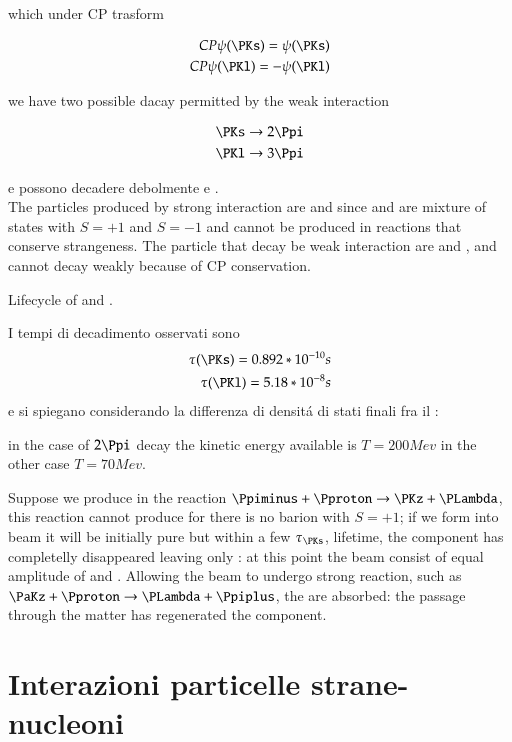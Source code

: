 \documentclass[main.tex]{subfiles}
\begin{document}
which under CP trasform 

\begin{align*}
CP\psi(\PKs)=\psi(\PKs)\\
CP\psi(\PKl)=-\psi(\PKl)
\end{align*}

we have two possible dacay permitted by the weak interaction

\begin{align*}
\PKs\rightarrow2\Ppi\\
\PKl\rightarrow3\Ppi
\end{align*}

\PKs e \PKl possono decadere debolmente \PKz e \PaKz.\\
The particles produced by strong interaction are \PKz and \PaKz since \PKl and \PKs are mixture of states with $S=+1$ and $S=-1$ and cannot be produced in reactions that conserve strangeness. The particle that decay be weak interaction are \PKs and \PKl, \PKz and \PaKz cannot decay weakly because of CP conservation.

Lifecycle of \PKl and \PKl.

I tempi di decadimento osservati sono
\begin{align*}
\tau(\PKs)=0.892*10^{-10} s\\
\tau(\PKl)=5.18*10^{-8} s\\
\end{align*}
e si spiegano considerando la differenza di densit\'a di stati finali fra il \lbt{2\Ppi}{3\Ppi}:

in the case of $2\Ppi$ decay the kinetic energy available is $T=200 Mev$ in the other case $T=70 Mev$.

Suppose we produce \PKz in the reaction $\Ppiminus+\Pproton\rightarrow\PKz+\PLambda$, this reaction cannot produce \PaKz for there is no barion with $S=+1$; if we form \PKz into beam it will be initially pure \PKz but within a few $\tau_{\PKs}$, \PKs lifetime, the \PKs component has completelly disappeared leaving only \PKl: at this point the beam consist of equal amplitude of \PKz and \PaKz. Allowing the beam to undergo strong reaction, such as $\PaKz+\Pproton\rightarrow\PLambda+\Ppiplus$, the \PaKz are absorbed: the passage through the matter has regenerated the \PKz component. 

\section{Interazioni particelle strane-nucleoni}
\end{document}
